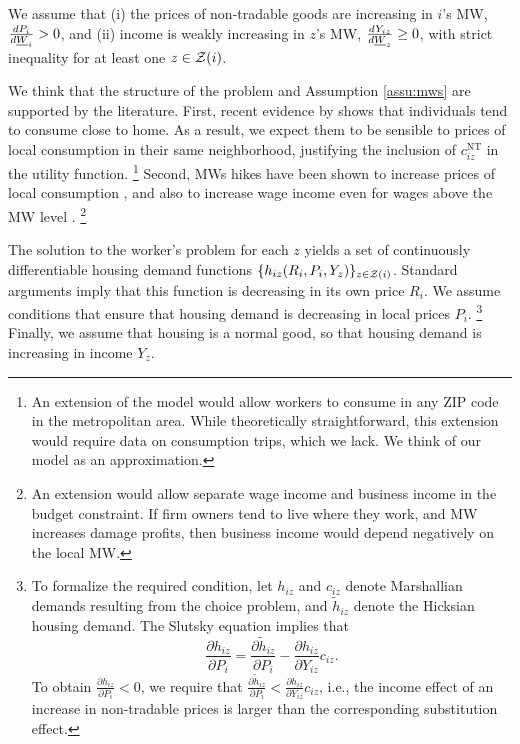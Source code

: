\begin{assu}\label{assu:mws}
    We assume that
    (i) the prices of non-tradable goods are increasing in $i$'s MW, 
    $\frac{d P_i}{d \underline{W}_i} > 0$, and
    (ii) income is weakly increasing in $z$'s MW, 
    $\frac{d Y_{iz}}{d \underline{W}_z} \geq 0$, with strict inequality 
    for at least one $z\in\mathcal{Z}(i)$.
\end{assu}

We think that the structure of the problem and
Assumption \ref{assu:mws} are supported by the literature.
First, recent evidence by \textcite{MiyauchiEtAl2021} shows that individuals tend 
to consume close to home.
As a result, we expect them to be sensible to prices of local consumption in their 
same neighborhood, justifying the inclusion of $c^{\text{NT}}_{iz}$ in the utility
function.%
\footnote{An extension of the model would allow workers to consume in any ZIP code
in the metropolitan area.
While theoretically straightforward, this extension would require data on consumption
trips, which we lack.
We think of our model as an approximation.}
Second, MWs hikes have been shown to increase prices of local consumption 
\parencite[e.g.,][]{AllegrettoReich2018, Leung2021},
and also to increase wage income even for wages above the MW 
level \parencite[e.g.,][]{CegnizEtAl2019}.%
\footnote{An extension would allow separate wage income and business income in 
the budget constraint.
If firm owners tend to live where they work, and MW increases damage profits,
then business income would depend negatively on the local MW.}

The solution to the worker's problem for each $z$ yields a set of continuously 
differentiable housing demand functions 
$\{h_{iz} (R_i, P_i, Y_z)\}_{z\in\mathcal{Z}(i)}$.
Standard arguments imply that this function is decreasing in its own price $R_i$.
We assume conditions that ensure that housing demand is decreasing in local 
prices $P_i$.%
\footnote{To formalize the required condition, let $h_{iz}$ and $c_{iz}$ denote 
Marshallian demands resulting from the choice problem, and $\tilde h_{iz}$ 
denote the Hicksian housing demand.
The Slutsky equation implies that
$$\frac{\partial h_{iz}}{\partial P_i} 
   = \frac{\partial \tilde h_{iz}}{\partial P_i} 
   - \frac{\partial h_{iz}}{\partial Y_{iz}} c_{iz}.$$
To obtain $\frac{\partial h_{iz}}{\partial P_i} < 0$, we require that 
$\frac{\partial \tilde h_{iz}}{\partial P_i} 
< \frac{\partial h_{iz}}{\partial Y_{iz}} c_{iz}$, i.e., the income effect of an 
increase in non-tradable prices is larger than the corresponding substitution 
effect.}
Finally, we assume that housing is a normal good, so that housing demand is 
increasing in income $Y_z$.


